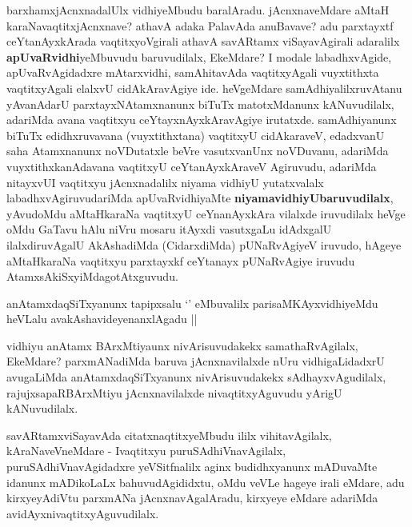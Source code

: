 \begin{center}


\end{center}

\begin{artha}
barxhamxjAcnxnadalUlx vidhiyeMbudu baralAradu. jAcnxnaveMdare aMtaH
karaNavaqtitxjAcnxnave? athavA adaka PalavAda anuBavave? adu
parxtayxtf ceYtanAyxkArada vaqtitxyoVgirali athavA savARtamx
viSayavAgirali adaralilx \textbf{apUvaRvidhi}yeMbuvudu baruvudilalx,
EkeMdare? I modale labadhxvAgide, apUvaRvAgidadxre mAtarxvidhi,
samAhitavAda vaqtitxyAgali vuyxtithxta vaqtitxyAgali elalxvU
cidAkAravAgiye ide. heVgeMdare samAdhiyalilxruvAtanu yAvanAdarU
parxtayxNAtamxnanunx biTuTx matotxMdanunx kANuvudilalx, adariMda avana
vaqtitxyu ceYtayxnAyxkAravAgiye irutatxde. samAdhiyanunx biTuTx
edidhxruvavana (vuyxtithxtana) vaqtitxyU cidAkaraveV, edadxvanU saha
Atamxnanunx noVDutatxle beVre vasutxvanUnx noVDuvanu, adariMda
vuyxtithxkanAdavana vaqtitxyU ceYtanAyxkAraveV Agiruvudu, adariMda
nitayxvUI vaqtitxyu  jAcnxnadalilx niyama vidhiyU yutatxvalalx
labadhxvAgiruvudariMda apUvaRvidhiyaMte
\textbf{niyamavidhiyUbaruvudilalx}, yAvudoMdu aMtaHkaraNa vaqtitxyU
ceYnanAyxkAra vilalxde iruvudilalx heVge oMdu GaTavu hAlu niVru mosaru
itAyxdi vasutxgaLu idAdxgalU ilalxdiruvAgalU AkAshadiMda (CidarxdiMda)
pUNaRvAgiyeV iruvudo, hAgeye aMtaHkaraNa vaqtitxyu parxtayxkf
ceYtanayx pUNaRvAgiye iruvudu AtamxsAkiSxyiMdagotAtxguvudu.
\end{artha}

\begin{center}


\end{center}

\begin{artha}
anAtamxdaqSiTxyanunx tapipxsalu `\stext' eMbuvalilx
parisaMKAyxvidhiyeMdu heVLalu avakAshavideyenanxlAgadu ||

vidhiyu anAtamx BArxMtiyaunx nivArisuvudakekx samathaRvAgilalx,
EkeMdare? parxmANadiMda baruva jAcnxnavilalxde nUru vidhigaLidadxrU
avugaLiMda anAtamxdaqSiTxyanunx nivArisuvudakekx sAdhayxvAgudilalx,
rajujxsapaRBArxMtiyu jAcnxnavilalxde nivaqtitxyAguvudu yArigU kANuvudilalx.
\end{artha}

\begin{artha}
savARtamxviSayavAda citatxnaqtitxyeMbudu ililx vihitavAgilalx,
kAraNaveVneMdare - Ivaqtitxyu puruSAdhiVnavAgilalx,
puruSAdhiVnavAgidadxre yeVSitfnalilx aginx budidhxyanunx mADuvaMte
idanunx mADikoLaLx bahuvudAgididxtu, oMdu veVLe hageye irali eMdare,
adu kirxyeyAdiVtu parxmANa jAcnxnavAgalAradu, kirxyeye eMdare adariMda avidAyxnivaqtitxyAguvudilalx.
\end{artha}

